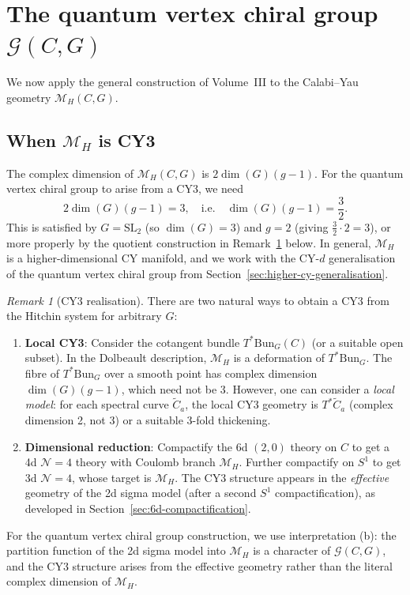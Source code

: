 \documentclass[11pt]{article}
\theoremstyle{definition}
\theoremstyle{remark}
\newtheorem{remark}[theorem]{Remark}
\newcommand{\Bun}{\mathrm{Bun}}
\newcommand{\cM}{\mathcal{M}}
\newcommand{\cN}{\mathcal{N}}
\begin{document}
\section{The quantum vertex chiral group $\mathcal{G}(C, G)$}
\label{sec:qvcg-hitchin}

We now apply the general construction of Volume~III to the Calabi--Yau geometry $\cM_H(C, G)$.

\subsection{When $\cM_H$ is CY3}

The complex dimension of $\cM_H(C, G)$ is $2\dim(G)(g - 1)$. For the quantum vertex chiral group to arise from a CY3, we need
\[
 2\dim(G)(g - 1) = 3, \quad \text{i.e.} \quad \dim(G)(g-1) = \frac{3}{2}.
\]
This is satisfied by $G = \mathrm{SL}_2$ (so $\dim(G) = 3$) and $g = 2$ (giving $\frac{3}{2} \cdot 2 = 3$), or more properly by the quotient construction in Remark~\ref{rem:cy3-realisation} below. In general, $\cM_H$ is a higher-dimensional CY manifold, and we work with the CY-$d$ generalisation of the quantum vertex chiral group from Section~\ref{sec:higher-cy-generalisation}.

\begin{remark}[CY3 realisation]
\label{rem:cy3-realisation}
There are two natural ways to obtain a CY3 from the Hitchin system for arbitrary $G$:
\begin{enumerate}[label=(\alph*)]
 \item \textbf{Local CY3}: Consider the cotangent bundle $T^*\Bun_G(C)$ (or a suitable open subset). In the Dolbeault description, $\cM_H$ is a deformation of $T^*\Bun_G$. The fibre of $T^*\Bun_G$ over a smooth point has complex dimension $\dim(G)(g-1)$, which need not be 3. However, one can consider a \emph{local model}: for each spectral curve $\widetilde{C}_a$, the local CY3 geometry is $T^*\widetilde{C}_a$ (complex dimension 2, not 3) or a suitable 3-fold thickening.
 \item \textbf{Dimensional reduction}: Compactify the 6d $(2,0)$ theory on $C$ to get a 4d $\cN = 4$ theory with Coulomb branch $\cM_H$. Further compactify on $S^1$ to get 3d $\cN = 4$, whose target is $\cM_H$. The CY3 structure appears in the \emph{effective} geometry of the 2d sigma model (after a second $S^1$ compactification), as developed in Section~\ref{sec:6d-compactification}.
\end{enumerate}
For the quantum vertex chiral group construction, we use interpretation (b): the partition function of the 2d sigma model into $\cM_H$ is a character of $\mathcal{G}(C, G)$, and the CY3 structure arises from the effective geometry rather than the literal complex dimension of $\cM_H$.
\end{remark}
\end{document}
